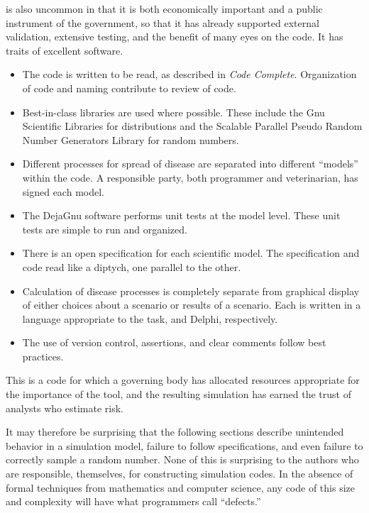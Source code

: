 \documentclass{article}
\begin{document}
\naadsm is also uncommon in that it is both economically important
and a public instrument of the government, so that it has already
supported external validation, extensive testing, and the
benefit of many eyes on the code. It has traits of excellent
software.
\begin{itemize}
  \item The code is written to be read, as described
      in \emph{Code Complete}\cite{mcconnell2004code}. Organization
      of code and naming contribute to review of code.
  \item Best-in-class libraries are used where possible. These
    include the Gnu Scientific Libraries for distributions
    and the Scalable Parallel Pseudo Random Number Generators
    Library for random numbers.
  \item Different processes for spread of disease are separated
    into different ``models'' within the code. A responsible party,
    both programmer and veterinarian, has signed each model.
  \item The DejaGnu software performs unit tests at the model
    level. These unit tests are simple to run and organized.
  \item There is an open specification for each scientific
    model. The specification and code read like a diptych,
    one parallel to the other.
  \item Calculation of disease processes is completely separate
    from graphical display of either choices about a scenario
    or results of a scenario. Each is written in a language
    appropriate to the task, \CC and Delphi, respectively.
  \item The use of version control, assertions, and clear
    comments follow best practices\cite{hunt2000pragmatic}.
\end{itemize}
This is a code for which a governing body has allocated resources
appropriate for the importance of the tool, and the resulting
simulation has earned the trust of analysts who estimate risk.

It may therefore be surprising that the following sections
describe unintended behavior in a simulation model,
failure to follow specifications, and even failure to
correctly sample a random number. None of this is
surprising to the authors who are responsible, themselves,
for constructing simulation codes. In the absence of formal
techniques from mathematics and computer science, any code
of this size and complexity will have what programmers
call ``defects.''
\end{document}
